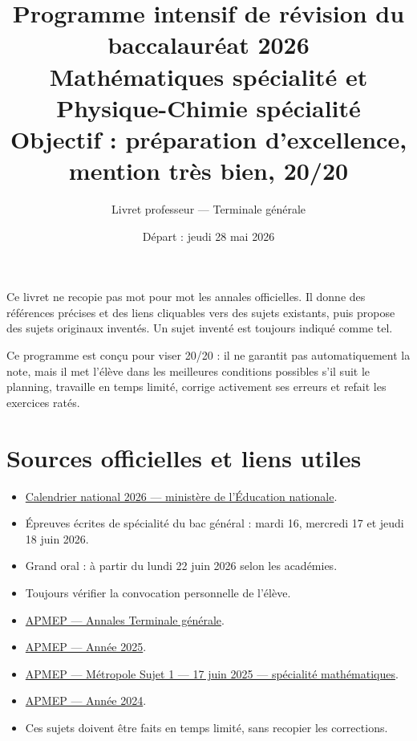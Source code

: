 \documentclass[11pt,a4paper]{article}
\title{
  \Huge\textbf{Programme intensif de révision du baccalauréat 2026}\\[2mm]
  \Large Mathématiques spécialité et Physique-Chimie spécialité\\[1mm]
  \large Objectif : préparation d'excellence, mention très bien, 20/20
}
\author{Livret professeur — Terminale générale}
\date{Départ : jeudi 28 mai 2026}
\begin{document}
\maketitle

\begin{alerte}
Ce livret ne recopie pas mot pour mot les annales officielles. Il donne des références précises et des liens cliquables vers des sujets existants, puis propose des sujets originaux inventés. Un sujet inventé est toujours indiqué comme tel.
\end{alerte}

\begin{alerte}[Objectif 20/20]
Ce programme est conçu pour viser 20/20 : il ne garantit pas automatiquement la note, mais il met l'élève dans les meilleures conditions possibles s'il suit le planning, travaille en temps limité, corrige activement ses erreurs et refait les exercices ratés.
\end{alerte}

\tableofcontents
\newpage

\section{Sources officielles et liens utiles}

\begin{sujetofficiel}
\begin{itemize}
  \item \href{https://www.education.gouv.fr/reussir-au-lycee/baccalaureat-brevet-cap-parcoursup-le-calendrier-2026-341384}{Calendrier national 2026 — ministère de l'Éducation nationale}.
  \item Épreuves écrites de spécialité du bac général : mardi 16, mercredi 17 et jeudi 18 juin 2026.
  \item Grand oral : à partir du lundi 22 juin 2026 selon les académies.
  \item Toujours vérifier la convocation personnelle de l'élève.
\end{itemize}
\end{sujetofficiel}

\begin{sujetofficiel}
\begin{itemize}
  \item \href{https://www.apmep.fr/Annales-Terminale-Generale}{APMEP — Annales Terminale générale}.
  \item \href{https://www.apmep.fr/Annee-2025}{APMEP — Année 2025}.
  \item \href{https://www.apmep.fr/IMG/pdf/Metro_J1_17_06_2025_DV.pdf}{APMEP — Métropole Sujet 1 — 17 juin 2025 — spécialité mathématiques}.
  \item \href{https://www.apmep.fr/Annee-2024}{APMEP — Année 2024}.
  \item Ces sujets doivent être faits en temps limité, sans recopier les corrections.
\end{itemize}
\end{sujetofficiel}
\end{document}
